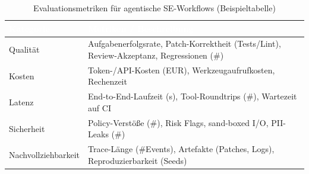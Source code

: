 \begin{table}[ht]
\centering
\caption{Evaluationsmetriken für agentische SE-Workflows (Beispieltabelle)}
\label{tab:eval-metrics}
\begin{tabularx}{\textwidth}{lX}
\toprule
\cellcolor{headercolor}\textcolor{white}{\textbf{Kategorie}} & \cellcolor{headercolor}\textcolor{white}{\textbf{Metriken / Beschreibung}} \\
\midrule
Qualität & Aufgabenerfolgsrate, Patch-Korrektheit (Tests/Lint), Review-Akzeptanz, Regressionen (\#) \\
\rowcolor{rowcolorgray}
Kosten & Token-/API-Kosten (EUR), Werkzeugaufrufkosten, Rechenzeit \\
Latenz & End-to-End-Laufzeit (s), Tool-Roundtrips (\#), Wartezeit auf CI \\
\rowcolor{rowcolorgray}
Sicherheit & Policy-Verstöße (\#), Risk Flags, sand-boxed I/O, PII-Leaks (\#) \\
Nachvollziehbarkeit & Trace-Länge (\#Events), Artefakte (Patches, Logs), Reproduzierbarkeit (Seeds) \\
\bottomrule
\end{tabularx}
\end{table}

